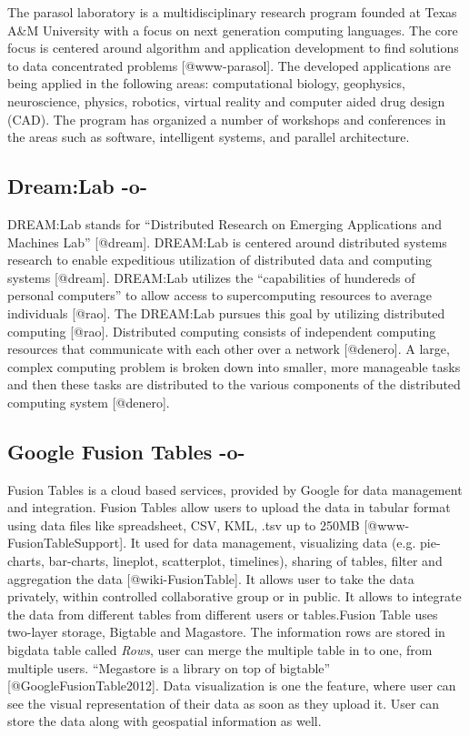 The parasol laboratory is a multidisciplinary research program founded
at Texas A\&M University with a focus on next generation computing
languages.  The core focus is centered around algorithm and
application development to find solutions to data concentrated
problems [@www-parasol]. The developed applications are being
applied in the following areas: computational biology, geophysics,
neuroscience, physics, robotics, virtual reality and computer aided
drug design (CAD).  The program has organized a number of workshops
and conferences in the areas such as software, intelligent systems,
and parallel architecture.
    
\subsection{Dream:Lab -o-}

DREAM:Lab stands for ``Distributed Research on Emerging Applications
and Machines Lab'' [@dream]. DREAM:Lab is centered around
distributed systems research to enable expeditious utilization of
distributed data and computing systems [@dream]. DREAM:Lab
utilizes the ``capabilities of hundereds of personal computers'' to
allow access to supercomputing resources to average
individuals [@rao]. The DREAM:Lab pursues this goal by utilizing
distributed computing [@rao].  Distributed computing consists of
independent computing resources that communicate with each other over
a network [@denero]. A large, complex computing problem is broken
down into smaller, more manageable tasks and then these tasks are
distributed to the various components of the distributed computing
system [@denero].


    
\subsection{Google Fusion Tables -o-}
    
Fusion Tables is a cloud based services, provided by Google for data
management and integration. Fusion Tables allow users to upload the
data in tabular format using data files like spreadsheet, CSV, KML,
.tsv up to 250MB [@www-FusionTableSupport]. It used for data
management, visualizing data (e.g. pie-charts, bar-charts, lineplot,
scatterplot, timelines), sharing of tables, filter and aggregation the
data [@wiki-FusionTable].  It allows user to take the data
privately, within controlled collaborative group or in public. It
allows to integrate the data from different tables from different
users or tables.Fusion Table uses two-layer storage, Bigtable and
Magastore. The information rows are stored in bigdata table called
\textit{Rows}, user can merge the multiple table in to one, from multiple
users. ``Megastore is a library on top of
bigtable'' [@GoogleFusionTable2012]. Data visualization is one the
feature, where user can see the visual representation of their data as
soon as they upload it. User can store the data along with geospatial
information as well.



